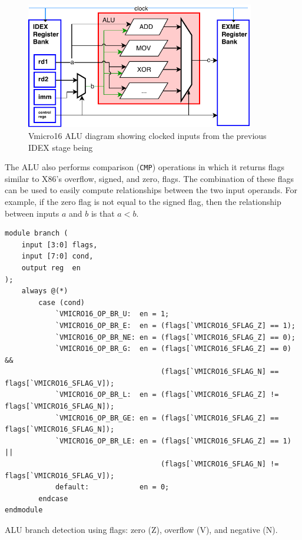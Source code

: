 \begin{figure}[H]
\centering 
\includegraphics[width=10cm]{../img/alu}
\caption{Vmicro16 ALU diagram showing clocked inputs from the previous IDEX stage being }
\label{fig:alu}
\end{figure}

The ALU also performs comparison (\verb|CMP|) operations in which it returns flags similar to X86's overflow, signed, and zero, flags. The combination of these flags can be used to easily compute relationships between the two input operands. For example, if the zero flag is not equal to the signed flag, then the relationship between inputs $a$ and $b$ is that $a < b$.

\begin{listing}[H]
\centering
\begin{verbatim}
module branch (
    input [3:0] flags,
    input [7:0] cond,
    output reg  en
);
    always @(*)
        case (cond)
            `VMICRO16_OP_BR_U:  en = 1;
            `VMICRO16_OP_BR_E:  en = (flags[`VMICRO16_SFLAG_Z] == 1);
            `VMICRO16_OP_BR_NE: en = (flags[`VMICRO16_SFLAG_Z] == 0);
            `VMICRO16_OP_BR_G:  en = (flags[`VMICRO16_SFLAG_Z] == 0) && 
                                     (flags[`VMICRO16_SFLAG_N] == flags[`VMICRO16_SFLAG_V]);
            `VMICRO16_OP_BR_L:  en = (flags[`VMICRO16_SFLAG_Z] != flags[`VMICRO16_SFLAG_N]);
            `VMICRO16_OP_BR_GE: en = (flags[`VMICRO16_SFLAG_Z] == flags[`VMICRO16_SFLAG_N]);
            `VMICRO16_OP_BR_LE: en = (flags[`VMICRO16_SFLAG_Z] == 1) || 
                                     (flags[`VMICRO16_SFLAG_N] != flags[`VMICRO16_SFLAG_V]);
            default:            en = 0;
        endcase
endmodule
\end{verbatim}
\caption{ALU branch detection using flags: zero (Z), overflow (V), and negative (N).}
\end{listing}


